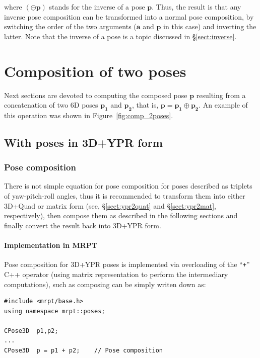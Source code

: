 \documentclass[a4paper,11pt]{report}
\begin{document}
\noindent where $(\ominus \mathbf{p})$ stands for the inverse of a pose $\mathbf{p}$. 
Thus, the result is that any inverse pose composition can be transformed into a normal 
pose composition, by switching the order of the two arguments
($\mathbf{a}$ and $\mathbf{p}$ in this case) and inverting the latter.
Note that the inverse of a pose is a topic discussed in \S \ref{sect:inverse}.


\chapter{Composition of two poses}
\label{ch:pose_pose_comp}

Next sections are devoted to computing the composed pose $\mathbf{p}$ resulting
from a concatenation of two 6D poses $\mathbf{p_1}$ and $\mathbf{p_2}$, 
that is, $\mathbf{p} = \mathbf{p_1} \oplus \mathbf{p_2}$. 
An example of this operation was shown in Figure~\ref{fig:comp_2poses}.

\section{With poses in 3D+YPR form}

\subsection{Pose composition}

There is not simple
equation for pose composition for poses described as triplets 
of yaw-pitch-roll angles, thus it is recommended to transform them into 
either 3D+Quad or matrix form 
(see, \S \ref{sect:ypr2quat} and \S \ref{sect:ypr2mat}, respectively), 
then compose them as described in the following sections and finally
convert the result back into 3D+YPR form.

\subsubsection{Implementation in MRPT}

Pose composition for 3D+YPR poses is implemented via overloading 
of the ``\texttt{+}'' C++ operator 
(using matrix representation to perform the intermediary computations), 
such as composing can be simply 
writen down as:

\begin{lstlisting}
#include <mrpt/base.h> 
using namespace mrpt::poses; 

CPose3D  p1,p2; 
...
CPose3D  p = p1 + p2;    // Pose composition
\end{lstlisting}
\end{document}
